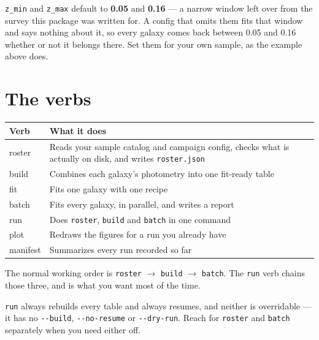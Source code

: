 \documentclass[11pt]{article}
\begin{document}
\begin{warnbox}
\texttt{z\_min} and \texttt{z\_max} default to \textbf{0.05} and
\textbf{0.16} --- a narrow window left over from the survey this package
was written for. A config that omits them fits that window and says
nothing about it, so every galaxy comes back between 0.05 and 0.16
whether or not it belongs there. Set them for your own sample, as the
example above does.
\end{warnbox}

\section{The verbs}

\begin{center}
\begin{tabular}{>{\ttfamily}l p{10.2cm}}
\toprule
\textbf{\normalfont Verb} & \textbf{What it does} \\
\midrule
roster   & Reads your sample catalog and campaign config, checks what is
           actually on disk, and writes \texttt{roster.json} \\
build    & Combines each galaxy's photometry into one fit-ready table \\
fit      & Fits one galaxy with one recipe \\
batch    & Fits every galaxy, in parallel, and writes a report \\
run      & Does \texttt{roster}, \texttt{build} and \texttt{batch} in one command \\
plot     & Redraws the figures for a run you already have \\
manifest & Summarizes every run recorded so far \\
\bottomrule
\end{tabular}
\end{center}

The normal working order is \texttt{roster} $\rightarrow$ \texttt{build}
$\rightarrow$ \texttt{batch}. The \texttt{run} verb chains those three,
and is what you want most of the time.

\texttt{run} always rebuilds every table and always resumes, and neither
is overridable --- it has no \texttt{-{}-build}, \texttt{-{}-no-resume}
or \texttt{-{}-dry-run}. Reach for \texttt{roster} and \texttt{batch}
separately when you need either off.
\end{document}
